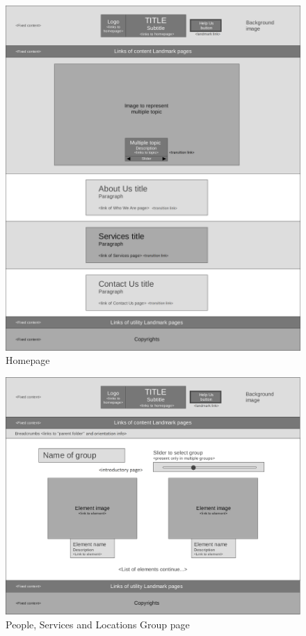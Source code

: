 \begin{figure}[h]
\includegraphics[width=1.27\textwidth, center]{MainMatter/images/1-Homepage}
\caption{Homepage}
\label{fig:figure2}
\end{figure}
%
\begin{figure}[h]
\includegraphics[width=1.3\textwidth, center]{MainMatter/images/2-Group-page}
\caption{People, Services and Locations Group page}
\label{fig:figure2}
\end{figure}
